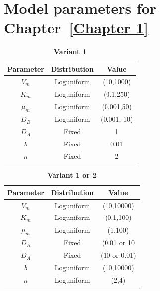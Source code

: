 \appendix
\chapter{Model parameters for Chapter~\ref{Chapter 1}}

\begin{table}[H]
    \centering
    \caption{\textbf{Variant 1}}
    \label{tab:variant_1}
    \renewcommand{\arraystretch}{1.3} %
    \begin{tabular}{|c|c|c|}
        \hline
        \textbf{Parameter} & \textbf{Distribution} & \textbf{Value}\\
        \hline
        $V_{m}$ & Loguniform & (10,1000)\\
        \hline
        $K_{m}$ & Loguniform & (0.1,250)\\
        \hline
        $\mu_{m}$ & Loguniform & (0.001,50)\\
        \hline
        $D_{B}$ & Loguniform & (0.001, 10)\\
        \hline
        $D_{A}$ & Fixed & 1\\
        \hline
        $b$ & Fixed & 0.01\\
        \hline
        $n$ & Fixed & 2\\
        \hline
    \end{tabular}
\end{table}


\begin{table}[H]
    \centering
    \caption{\textbf{Variant 1 or 2}}
    \label{tab:variant_2}
    \renewcommand{\arraystretch}{1.3} %
    \begin{tabular}{|c|c|c|}
        \hline
        \textbf{Parameter} & \textbf{Distribution} & \textbf{Value}\\
        \hline
        $V_{m}$ & Loguniform & (10,10000)\\
        \hline
        $K_{m}$ & Loguniform & (0.1,100)\\
        \hline
        $\mu_{m}$ & Loguniform & (1,100)\\
        \hline
        $D_{B}$ & Fixed & (0.01 or 10\\
        \hline
        $D_{A}$ & Fixed & (10 or 0.01)\\
        \hline
        $b$ & Loguniform & (10,10000)\\
        \hline
        $n$ & Loguniform & (2,4)\\
        \hline
    \end{tabular}
\end{table}

